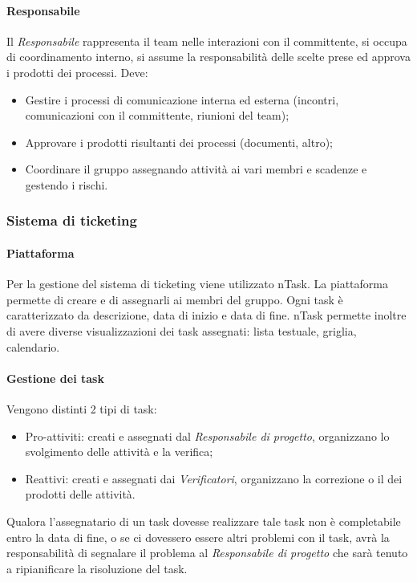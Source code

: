 \paragraph{Responsabile} \Spazio
Il \emph{Responsabile} rappresenta il team nelle interazioni con il committente, si occupa di coordinamento interno, si assume la responsabilità delle scelte prese ed approva i prodotti dei processi. Deve:
\begin{itemize}
\item Gestire i processi di comunicazione interna ed esterna (incontri, comunicazioni con il committente, riunioni del team);
\item Approvare i prodotti risultanti dei processi (documenti, altro);
\item Coordinare il gruppo assegnando attività ai vari membri e scadenze e gestendo i rischi.
\end{itemize}

\subsubsection{Sistema di ticketing}
\paragraph{Piattaforma} \Spazio
Per la gestione del sistema di ticketing viene utilizzato nTask. La piattaforma permette
di creare  e di assegnarli ai membri del gruppo. Ogni task è caratterizzato da
descrizione, data di inizio e data di fine. nTask permette inoltre di avere diverse visualizzazioni dei task assegnati: lista testuale, griglia, calendario.

\paragraph{Gestione dei task} \Spazio
Vengono distinti 2 tipi di task:
\begin{itemize}
\item Pro-attiviti: creati e assegnati dal \emph{Responsabile di progetto}, organizzano lo svolgimento delle attività e la verifica;
\item Reattivi: creati e assegnati dai \emph{Verificatori}, organizzano la correzione o il  dei prodotti delle attività.
\end{itemize}
Qualora l'assegnatario di un task dovesse realizzare tale task non è completabile entro la data di fine, o se ci dovessero essere altri problemi con il task, avrà la responsabilità di segnalare il problema al \emph{Responsabile di progetto} che sarà tenuto a ripianificare la risoluzione del task.

